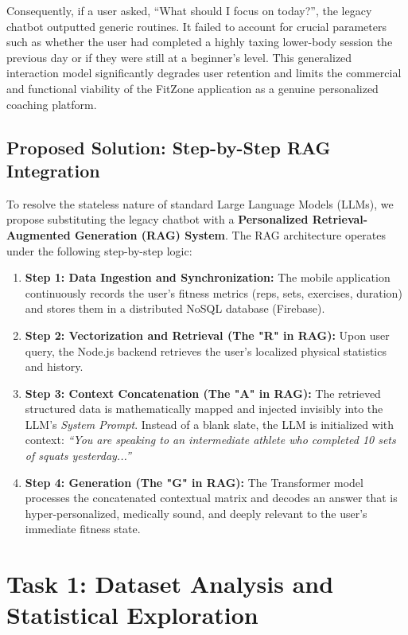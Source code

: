 \documentclass[12pt, a4paper]{report}
\begin{document}
Consequently, if a user asked, ``What should I focus on today?'', the legacy chatbot outputted generic routines. It failed to account for crucial parameters such as whether the user had completed a highly taxing lower-body session the previous day or if they were still at a beginner's level. This generalized interaction model significantly degrades user retention and limits the commercial and functional viability of the FitZone application as a genuine personalized coaching platform.

\section{Proposed Solution: Step-by-Step RAG Integration}
To resolve the stateless nature of standard Large Language Models (LLMs), we propose substituting the legacy chatbot with a \textbf{Personalized Retrieval-Augmented Generation (RAG) System}. The RAG architecture operates under the following step-by-step logic:

\begin{enumerate}
    \item \textbf{Step 1: Data Ingestion and Synchronization:} The mobile application continuously records the user's fitness metrics (reps, sets, exercises, duration) and stores them in a distributed NoSQL database (Firebase).
    \item \textbf{Step 2: Vectorization and Retrieval (The "R" in RAG):} Upon user query, the Node.js backend retrieves the user's localized physical statistics and history.
    \item \textbf{Step 3: Context Concatenation (The "A" in RAG):} The retrieved structured data is mathematically mapped and injected invisibly into the LLM's \textit{System Prompt}. Instead of a blank slate, the LLM is initialized with context: \textit{``You are speaking to an intermediate athlete who completed 10 sets of squats yesterday...''}
    \item \textbf{Step 4: Generation (The "G" in RAG):} The Transformer model processes the concatenated contextual matrix and decodes an answer that is hyper-personalized, medically sound, and deeply relevant to the user's immediate fitness state.
\end{enumerate}

\chapter{Task 1: Dataset Analysis and Statistical Exploration}
\end{document}
